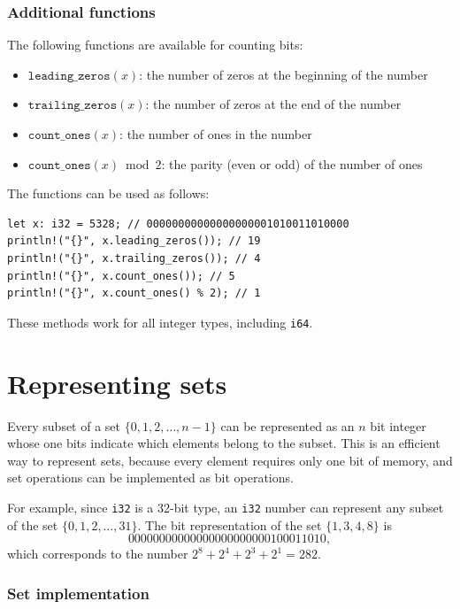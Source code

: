 \subsubsection*{Additional functions}

The following functions are available
for counting bits:

\begin{itemize}
\item
$\texttt{leading\_zeros}(x)$:
the number of zeros at the beginning of the number
\item
$\texttt{trailing\_zeros}(x)$:
the number of zeros at the end of the number
\item
$\texttt{count\_ones}(x)$:
the number of ones in the number
\item
$\texttt{count\_ones}(x) \bmod 2$:
the parity (even or odd) of the number of ones
\end{itemize}
\begin{samepage}

The functions can be used as follows:
\begin{lstlisting}
let x: i32 = 5328; // 00000000000000000001010011010000
println!("{}", x.leading_zeros()); // 19
println!("{}", x.trailing_zeros()); // 4
println!("{}", x.count_ones()); // 5
println!("{}", x.count_ones() % 2); // 1
\end{lstlisting}
\end{samepage}

These methods work for all integer types,
including \texttt{i64}.

\section{Representing sets}

Every subset of a set
$\{0,1,2,\ldots,n-1\}$
can be represented as an $n$ bit integer
whose one bits indicate which
elements belong to the subset.
This is an efficient way to represent sets,
because every element requires only one bit of memory,
and set operations can be implemented as bit operations.

For example, since \texttt{i32} is a 32-bit type,
an \texttt{i32} number can represent any subset
of the set $\{0,1,2,\ldots,31\}$.
The bit representation of the set $\{1,3,4,8\}$ is
\[00000000000000000000000100011010,\]
which corresponds to the number $2^8+2^4+2^3+2^1=282$.

\subsubsection{Set implementation}

